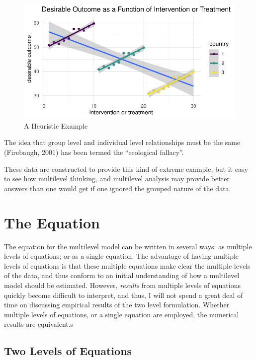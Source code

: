 \documentclass[
  letterpaper,
  DIV=11,
  numbers=noendperiod]{scrreprt}
\begin{document}
\begin{figure}

{\centering \includegraphics{cross-sectional_files/figure-pdf/unnamed-chunk-9-1.pdf}

}

\caption{A Heuristic Example}

\end{figure}

The idea that group level and individual level relationships must be the
same (Firebaugh, 2001) has been termed the ``ecological fallacy''.

These data are constructed to provide this kind of extreme example, but
it easy to see how multilevel thinking, and multilevel analysis may
provide better answers than one would get if one ignored the grouped
nature of the data.

\hypertarget{the-equation}{%
\section{The Equation}\label{the-equation}}

The equation for the multilevel model can be written in several ways: as
multiple levels of equations; or as a single equation. The advantage of
having multiple levels of equations is that these multiple equations
make clear the multiple levels of the data, and thus conform to an
initial understanding of how a multilevel model should be estimated.
However, \emph{results} from multiple levels of equations quickly become
difficult to interpret, and thus, I will not spend a great deal of time
on discussing empirical results of the two level formulation. Whether
multiple levels of equations, or a single equation are employed, the
numerical results are equivalent.s

\hypertarget{two-levels-of-equations}{%
\subsection{Two Levels of Equations}\label{two-levels-of-equations}}
\end{document}
